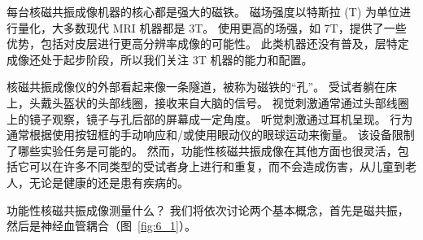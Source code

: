 每台核磁共振成像机器的核心都是强大的磁铁。 
磁场强度以特斯拉 (T) 为单位进行量化，大多数现代 MRI 机器都是 3T。 
使用更高的场强，如 7T，提供了一些优势，包括对皮层进行更高分辨率成像的可能性。
此类机器还没有普及，层特定成像还处于起步阶段，所以我们关注 3T 机器的能力和配置。


核磁共振成像仪的外部看起来像一条隧道，被称为磁铁的“孔”。
受试者躺在床上，头戴头盔状的头部线圈，接收来自大脑的信号。
视觉刺激通常通过头部线圈上的镜子观察，镜子与孔后部的屏幕成一定角度。
听觉刺激通过耳机呈现。
行为通常根据使用按钮框的手动响应和/或使用眼动仪的眼球运动来衡量。
该设备限制了哪些实验任务是可能的。
然而，功能性核磁共振成像在其他方面也很灵活，包括它可以在许多不同类型的受试者身上进行和重复，而不会造成伤害，从儿童到老人，无论是健康的还是患有疾病的。


功能性核磁共振成像测量什么？ 
我们将依次讨论两个基本概念，首先是磁共振，然后是神经血管耦合（图~\ref{fig:6_1}）。

